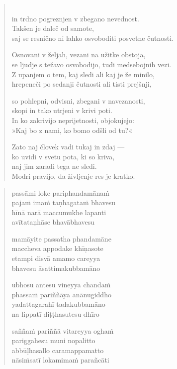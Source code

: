 \begin{verse}

\\
in trdno pogreznjen v zbegano nevednost.\\
Takšen je daleč od samote,\\
saj se resnično ni lahko osvoboditi posvetne čutnosti.

Osnovani v željah, vezani na užitke obstoja,\\
se ljudje s težavo osvobodijo, tudi medsebojnih vezi.\\
Z upanjem o tem, kaj sledi ali kaj je že minilo,\\
hrepeneči po sedanji čutnosti ali tisti prejšnji,

so pohlepni, odvisni, zbegani v navezanosti,\\
skopi in tako utrjeni v krivi poti.\\
In ko zakrivijo neprijetnosti, objokujejo:\\
»Kaj bo z nami, ko bomo odšli od tu?«

Zato naj človek vadi tukaj in zdaj —\\
ko uvidi v svetu pota, ki so kriva,\\
naj jim zaradi tega ne sledi.\\
Modri pravijo, da življenje res je kratko.

\end{verse}


\clearpage
\begin{verse}

passāmi loke pariphandamānaṁ\\
pajaṁ imaṁ taṇhagataṁ bhavesu\\
hīnā narā maccumukhe lapanti\\
avītataṇhāse bhavābhavesu

mamāyite passatha phandamāne\\
maccheva appodake khīṇasote\\
etampi disvā amamo careyya\\
bhavesu āsattimakubbamāno

ubhosu antesu vineyya chandaṁ\\
phassaṁ pariññāya anānugiddho\\
yadattagarahī tadakubbamāno\\
na lippatī diṭṭhasutesu dhīro

saññaṁ pariññā vitareyya oghaṁ\\
pariggahesu muni nopalitto\\
abbūḷhasallo caramappamatto\\
nāsiṁsatī lokamimaṁ parañcāti

\end{verse}

